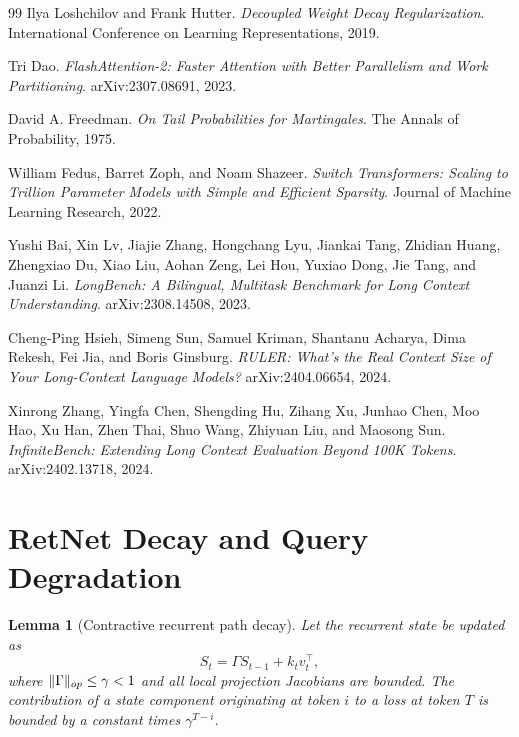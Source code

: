 \documentclass[11pt]{article}
\newtheorem{lemma}[theorem]{Lemma}
\DeclarePairedDelimiter{\norm}{\lVert}{\rVert}
\begin{document}
\begin{thebibliography}{99}
Ilya Loshchilov and Frank Hutter.
\textit{Decoupled Weight Decay Regularization}.
International Conference on Learning Representations, 2019.

Tri Dao.
\textit{FlashAttention-2: Faster Attention with Better Parallelism and Work Partitioning}.
arXiv:2307.08691, 2023.

David A. Freedman.
\textit{On Tail Probabilities for Martingales}.
The Annals of Probability, 1975.

William Fedus, Barret Zoph, and Noam Shazeer.
\textit{Switch Transformers: Scaling to Trillion Parameter Models with Simple and Efficient Sparsity}.
Journal of Machine Learning Research, 2022.

Yushi Bai, Xin Lv, Jiajie Zhang, Hongchang Lyu, Jiankai Tang, Zhidian Huang, Zhengxiao Du, Xiao Liu, Aohan Zeng, Lei Hou, Yuxiao Dong, Jie Tang, and Juanzi Li.
\textit{LongBench: A Bilingual, Multitask Benchmark for Long Context Understanding}.
arXiv:2308.14508, 2023.

Cheng-Ping Hsieh, Simeng Sun, Samuel Kriman, Shantanu Acharya, Dima Rekesh, Fei Jia, and Boris Ginsburg.
\textit{RULER: What's the Real Context Size of Your Long-Context Language Models?}
arXiv:2404.06654, 2024.

Xinrong Zhang, Yingfa Chen, Shengding Hu, Zihang Xu, Junhao Chen, Moo Hao, Xu Han, Zhen Thai, Shuo Wang, Zhiyuan Liu, and Maosong Sun.
\textit{InfiniteBench: Extending Long Context Evaluation Beyond 100K Tokens}.
arXiv:2402.13718, 2024.

\end{thebibliography}

\newpage
\appendix

\section{RetNet Decay and Query Degradation}
\label{app:retnet}

\begin{lemma}[Contractive recurrent path decay]
Let the recurrent state be updated as
\begin{equation}
S_t = \Gamma S_{t-1} + k_t v_t^\top,
\end{equation}
where $\norm{\Gamma}_{op}\leq \gamma<1$ and all local projection Jacobians are bounded. The contribution of a state component originating at token $i$ to a loss at token $T$ is bounded by a constant times $\gamma^{T-i}$.
\end{lemma}
\end{document}
